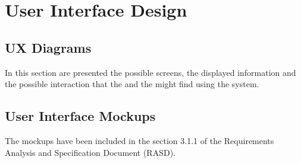 \documentclass[../DD.tex]{subfiles}
\begin{document}
\chapter{User Interface Design}
\thispagestyle{fancy}

\section{UX Diagrams\label{3.1}}
In this section are presented the possible screens, the displayed information and the possible interaction that the  and the  might find using the system.


\section{User Interface Mockups\label{3.2}}
The mockups have been included in the section 3.1.1 of the Requirements Analysis and Specification Document (RASD).	
\end{document}
